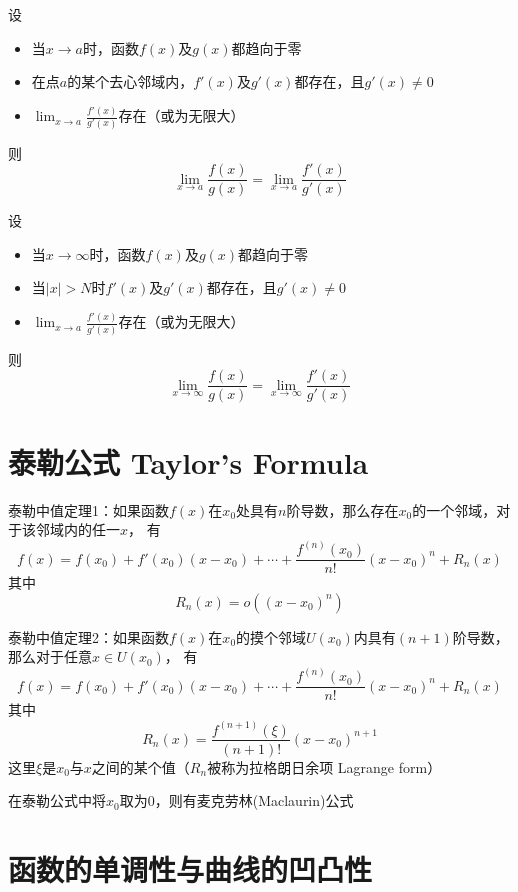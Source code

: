 \documentclass[UTF8]{ctexart}
\begin{document}
\bigskip

设
\begin{itemize}
  \item 当$x\to a$时，函数$f(x)$及$g(x)$都趋向于零
  \item 在点$a$的某个去心邻域内，$f'(x)$及$g'(x)$都存在，且$g'(x)\ne0$
  \item $\lim_{x\to a}\frac{f'(x)}{g'(x)}$存在（或为无限大）
\end{itemize}
则
\[ \lim_{x\to a}\frac{f(x)}{g(x)}=\lim_{x\to a}\frac{f'(x)}{g'(x)} \]

\bigskip

设
\begin{itemize}
  \item 当$x\to\infty$时，函数$f(x)$及$g(x)$都趋向于零
  \item 当$|x|>N$时$f'(x)$及$g'(x)$都存在，且$g'(x)\ne0$
  \item $\lim_{x\to a}\frac{f'(x)}{g'(x)}$存在（或为无限大）
\end{itemize}
则
\[ \lim_{x\to\infty}\frac{f(x)}{g(x)}=\lim_{x\to\infty}\frac{f'(x)}{g'(x)} \]

\bigskip
\bigskip

\section*{泰勒公式 Taylor's Formula}

\bigskip

泰勒中值定理1：如果函数$f(x)$在$x_0$处具有$n$阶导数，那么存在$x_0$的一个邻域，对于该邻域内的任一$x$，
有
\[ f(x)=f(x_0)+f'(x_0)(x-x_0)+\cdots+\frac{f^{(n)}(x_0)}{n!}(x-x_0)^n+R_n(x) \]
其中
\[ R_n(x)=o((x-x_0)^n) \]

\bigskip

泰勒中值定理2：如果函数$f(x)$在$x_0$的摸个邻域$U(x_0)$内具有$(n+1)$阶导数，那么对于任意$x\in U(x_0)$，
有
\[ f(x)=f(x_0)+f'(x_0)(x-x_0)+\cdots+\frac{f^{(n)}(x_0)}{n!}(x-x_0)^n+R_n(x) \]
其中
\[ R_n(x)=\frac{f^{(n+1)}(\xi)}{(n+1)!}(x-x_0)^{n+1} \]
这里$\xi$是$x_0$与$x$之间的某个值（$R_n$被称为拉格朗日余项 Lagrange form）

\bigskip

在泰勒公式中将$x_0$取为0，则有麦克劳林(Maclaurin)公式

\bigskip
\bigskip

\section*{函数的单调性与曲线的凹凸性}
\end{document}
